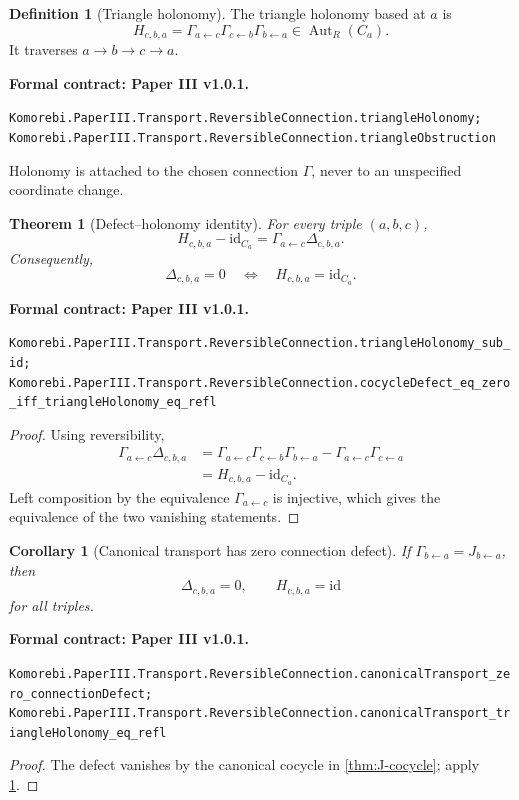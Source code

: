 \documentclass[11pt,a4paper]{article}
\newtheorem{theorem}{Theorem}[section]
\theoremstyle{plain}
\newtheorem{corollary}[corollary]{Corollary}
\theoremstyle{definition}
\newtheorem{definition}[definition]{Definition}
\theoremstyle{remark}
\newcommand{\id}{\mathrm{id}}
\newcommand{\leanname}[1]{\nolinkurl{#1}}
\newcommand{\statusleanthree}[1]{\par\smallskip\noindent\begin{minipage}{\linewidth}{\color{leanblue}\textbf{Formal contract: Paper III v1.0.1.}}\par\begingroup\small\raggedright\leanname{#1}\par\endgroup\end{minipage}\par\smallskip}
\begin{document}
\begin{definition}[Triangle holonomy]
\label{def:triangle-holonomy}
The triangle holonomy based at $a$ is
\[
H_{c,b,a}
=
\Gamma_{a\leftarrow c}
\Gamma_{c\leftarrow b}
\Gamma_{b\leftarrow a}
\in\operatorname{Aut}_R(C_a).
\]
It traverses $a\to b\to c\to a$.
\end{definition}
\statusleanthree{Komorebi.PaperIII.Transport.ReversibleConnection.triangleHolonomy; Komorebi.PaperIII.Transport.ReversibleConnection.triangleObstruction}

Holonomy is attached to the chosen connection $\Gamma$, never to an
unspecified coordinate change.

\begin{theorem}[Defect--holonomy identity]
\label{thm:defect-holonomy}
For every triple $(a,b,c)$,
\[
\boxed{
H_{c,b,a}-\id_{C_a}
=
\Gamma_{a\leftarrow c}\Delta_{c,b,a}.
}
\]
Consequently,
\[
\Delta_{c,b,a}=0
\quad\Longleftrightarrow\quad
H_{c,b,a}=\id_{C_a}.
\]
\end{theorem}
\statusleanthree{Komorebi.PaperIII.Transport.ReversibleConnection.triangleHolonomy_sub_id; Komorebi.PaperIII.Transport.ReversibleConnection.cocycleDefect_eq_zero_iff_triangleHolonomy_eq_refl}

\begin{proof}
Using reversibility,
\[
\begin{aligned}
\Gamma_{a\leftarrow c}\Delta_{c,b,a}
&=
\Gamma_{a\leftarrow c}
\Gamma_{c\leftarrow b}
\Gamma_{b\leftarrow a}
-
\Gamma_{a\leftarrow c}\Gamma_{c\leftarrow a}\\
&=H_{c,b,a}-\id_{C_a}.
\end{aligned}
\]
Left composition by the equivalence $\Gamma_{a\leftarrow c}$ is injective,
which gives the equivalence of the two vanishing statements.
\end{proof}

\begin{corollary}[Canonical transport has zero connection defect]
\label{cor:canonical-zero-defect}
If $\Gamma_{b\leftarrow a}=J_{b\leftarrow a}$, then
\[
\Delta_{c,b,a}=0,
\qquad
H_{c,b,a}=\id
\]
for all triples.
\end{corollary}
\statusleanthree{Komorebi.PaperIII.Transport.ReversibleConnection.canonicalTransport_zero_connectionDefect; Komorebi.PaperIII.Transport.ReversibleConnection.canonicalTransport_triangleHolonomy_eq_refl}

\begin{proof}
The defect vanishes by the canonical cocycle in
\cref{thm:J-cocycle}; apply \cref{thm:defect-holonomy}.
\end{proof}
\end{document}
